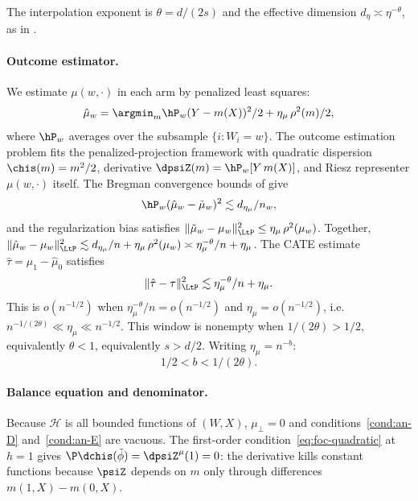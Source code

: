 \documentclass{article}
\begin{document}
The interpolation exponent is $\theta = d/(2s)$
and the effective dimension
$d_\eta \asymp \eta^{-\theta}$,
as in .

\paragraph{Outcome estimator.}
We estimate $\mu(w, \cdot)$ in each arm
by penalized least squares:
\begin{equation}\label{eq:vcate-outcome}
\hat\mu_w
  = \argmin_{m}
    \hP_w (Y - m(X))^2/2
    + \eta_\mu\, \rho^2(m)/2,
\end{equation}
where $\hP_w$ averages over the subsample
$\{i : W_i = w\}$.
The outcome estimation problem
fits the penalized-projection framework
with quadratic dispersion $\chis(m) = m^2/2$,
derivative $\dpsiZ(m) = \hP_w[Y\, m(X)]$,
and Riesz representer $\mu(w, \cdot)$ itself.
The Bregman convergence bounds of
 give
\begin{equation}\label{eq:vcate-outcome-rate}
\hP_w (\hat\mu_w - \tilde\mu_w)^2
  \lesssim d_{\eta_\mu}/n_w,
\end{equation}
and the regularization bias satisfies
$\|\tilde\mu_w - \mu_w\|_{\LtP}^2
  \le \eta_\mu\, \rho^2(\mu_w)$.
Together,
$\|\hat\mu_w - \mu_w\|_{\LtP}^2
  \lesssim d_{\eta_\mu}/n + \eta_\mu\, \rho^2(\mu_w)
  \asymp \eta_\mu^{-\theta}/n + \eta_\mu$.
The CATE estimate $\hat\tau = \hat\mu_1 - \hat\mu_0$
satisfies
\begin{equation}\label{eq:vcate-cate-rate}
\|\hat\tau - \tau\|_{\LtP}^2
  \lesssim \eta_\mu^{-\theta}/n + \eta_\mu.
\end{equation}
This is $o(n^{-1/2})$
when $\eta_\mu^{-\theta}/n = o(n^{-1/2})$
and $\eta_\mu = o(n^{-1/2})$,
i.e.\ $n^{-1/(2\theta)} \ll \eta_\mu \ll n^{-1/2}$.
This window is nonempty when $1/(2\theta) > 1/2$,
equivalently $\theta < 1$,
equivalently $s > d/2$.
Writing $\eta_\mu = n^{-b}$:
\begin{equation}\label{eq:vcate-outcome-window}
1/2 < b < 1/(2\theta).
\end{equation}

\paragraph{Balance equation and denominator.}
Because $\mathcal{H}$ is all bounded functions
of $(W,X)$,
$\mu_\perp = 0$
and conditions~\ref{cond:an-D} and~\ref{cond:an-E}
are vacuous.
The first-order condition~\eqref{eq:foc-quadratic}
at $h = 1$ gives
$\P\dchis(\tilde\phi) = \dpsiZ^\mu(1) = 0$:
the derivative kills constant functions
because $\psiZ$ depends on $m$
only through differences $m(1,X) - m(0,X)$.
\end{document}
